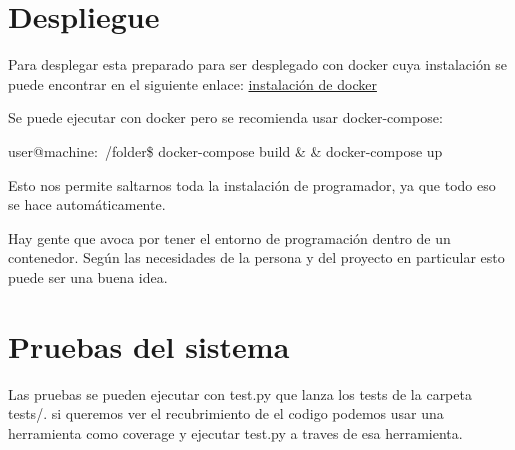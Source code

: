 \section{Despliegue}

Para desplegar esta preparado para ser desplegado con docker cuya instalación se puede encontrar en el siguiente enlace:  \href{https://docs.docker.com/engine/installation}{instalación de docker} 
	

Se puede ejecutar con docker pero se recomienda usar docker-compose:

user@machine:~/folder\$ docker-compose build \& \& docker-compose up 

Esto nos permite saltarnos toda la instalación de programador, ya que todo eso se hace automáticamente.

Hay gente que avoca por tener el entorno de programación dentro de un contenedor. Según las necesidades de la persona y del proyecto en particular esto puede ser una buena idea. 


\section{Pruebas del sistema}

Las pruebas se pueden ejecutar con test.py que lanza los tests de la carpeta tests/. si queremos ver el recubrimiento de el codigo podemos usar una herramienta como coverage y ejecutar test.py a traves de esa herramienta.  



